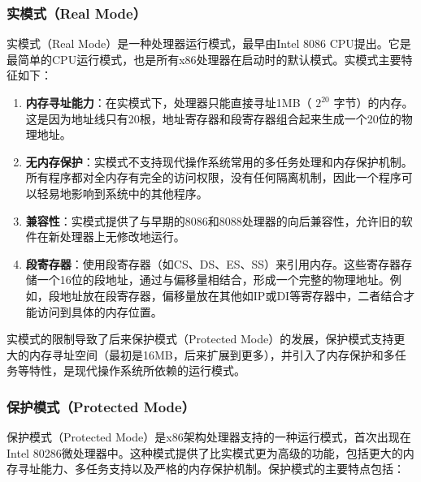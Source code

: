 \subsubsection{实模式（Real Mode）}

实模式（Real Mode）是一种处理器运行模式，最早由Intel 8086 CPU提出。它是最简单的CPU运行模式，也是所有x86处理器在启动时的默认模式。实模式主要特征如下：

\begin{enumerate}
    \item \textbf{内存寻址能力}：在实模式下，处理器只能直接寻址1MB（ $2^{20}$ 字节）的内存。这是因为地址线只有20根，地址寄存器和段寄存器组合起来生成一个20位的物理地址。
    \item \textbf{无内存保护}：实模式不支持现代操作系统常用的多任务处理和内存保护机制。所有程序都对全内存有完全的访问权限，没有任何隔离机制，因此一个程序可以轻易地影响到系统中的其他程序。
    \item \textbf{兼容性}：实模式提供了与早期的8086和8088处理器的向后兼容性，允许旧的软件在新处理器上无修改地运行。
    \item \textbf{段寄存器}：使用段寄存器（如CS、DS、ES、SS）来引用内存。这些寄存器存储一个16位的段地址，通过与偏移量相结合，形成一个完整的物理地址。例如，段地址放在段寄存器，偏移量放在其他如IP或DI等寄存器中，二者结合才能访问到具体的内存位置。
\end{enumerate}

实模式的限制导致了后来保护模式（Protected Mode）的发展，保护模式支持更大的内存寻址空间（最初是16MB，后来扩展到更多），并引入了内存保护和多任务等特性，是现代操作系统所依赖的运行模式。

\subsubsection{保护模式（Protected Mode）}

保护模式（Protected Mode）是x86架构处理器支持的一种运行模式，首次出现在Intel 80286微处理器中。这种模式提供了比实模式更为高级的功能，包括更大的内存寻址能力、多任务支持以及严格的内存保护机制。保护模式的主要特点包括：

